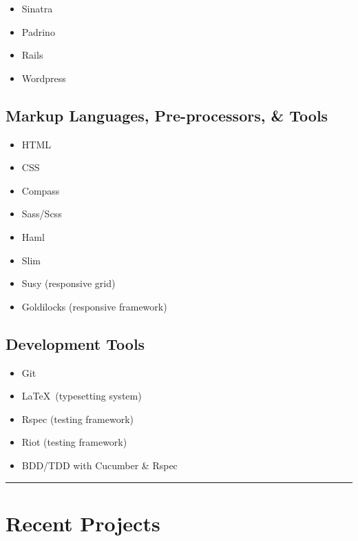 \documentclass{article}
\begin{document}
\begin{multicols}{2}
\begin{itemize}
  \item Sinatra
  \item Padrino
  \item Rails
  \item Wordpress
\end{itemize}

\subsection{Markup Languages, Pre-processors, \& Tools} %
\label{sub:Markup Languages, Pre-processors, \& Tools}

\begin{itemize}
  \item HTML
  \item CSS
  \item Compass
  \item Sass/Scss
  \item Haml
  \item Slim
  \item Susy (responsive grid)
  \item Goldilocks (responsive framework)
\end{itemize}

\subsection{Development Tools} %
\label{sub:Development Tools}

\begin{itemize}
  \item Git
  \item \LaTeX\ (typesetting system)
  \item Rspec (testing framework)
  \item Riot (testing framework)
  \item BDD/TDD with Cucumber \& Rspec
\end{itemize}


\end{multicols}
\hrule
\section{Recent Projects} %
\label{sec:Recent Projects}
\end{document}
